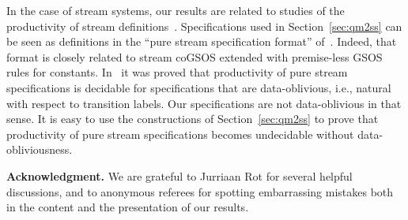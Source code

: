 \documentclass[adraft,copyright,creativecommons]{eptcs}
\begin{document}
In the case of stream systems, our results are related to studies of the productivity of stream definitions~\cite{endrullis-pebble}. Specifications used in Section~\ref{sec:qm2ss} can be seen as definitions in the ``pure stream specification format'' of~\cite{endrullis-pebble}. Indeed, that format is closely related to stream coGSOS extended with premise-less GSOS rules for constants. In~\cite{endrullis-pebble} it was proved that productivity of pure stream specifications is decidable for specifications that are data-oblivious, i.e., natural with respect to transition labels. Our specifications are not data-oblivious in that sense. It is easy to use the constructions of Section~\ref{sec:qm2ss} to prove that productivity of pure stream specifications becomes undecidable without data-obliviousness.

\noindent
{\bf Acknowledgment.} We are grateful to Jurriaan Rot for several helpful discussions, and to anonymous referees for spotting embarrassing mistakes both in the content and the presentation of our results.


\end{document}
